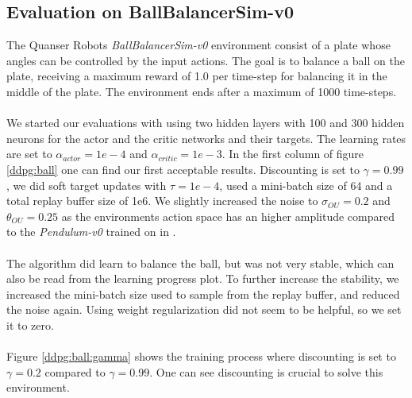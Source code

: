 \subsection{Evaluation on BallBalancerSim-v0}
The Quanser Robots \textit{BallBalancerSim-v0} environment consist of a plate whose angles can be controlled by the input actions. The goal is to balance a ball on the plate, receiving a maximum reward of 1.0 per time-step for balancing it in the middle of the plate. The environment ends after a maximum of 1000 time-steps.\\
\\
We started our evaluations with using two hidden layers with 100 and 300 hidden neurons for the actor and the critic networks and their targets. The learning rates are set to $\alpha_{actor}=1e-4$ and $\alpha_{critic}=1e-3$.  In the first column of figure \ref{ddpg:ball} one can find our first acceptable results. Discounting is set to $\gamma=0.99$, we did soft target updates with $\tau=1e-4$, used a mini-batch size of 64 and a total replay buffer size of 1e6. We slightly increased the noise to $\sigma_{OU}=0.2$ and $\theta_{OU}=0.25$ as the environments action space has an higher amplitude compared to the \textit{Pendulum-v0} trained on in \citep{lillicrap2015continuous}.\\
\\
The algorithm did learn to balance the ball, but was not very stable, which can also be read from the learning progress plot. To further increase the stability, we increased the mini-batch size used to sample from the replay buffer, and reduced the noise again. Using weight regularization did not seem to be helpful, so we set it to zero.\\
\\
Figure \ref{ddpg:ball:gamma} shows the training process where discounting is set to $\gamma=0.2$ compared to $\gamma=0.99$. One can see discounting is crucial to solve this environment.
